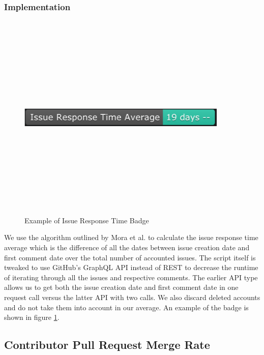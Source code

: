 \documentclass[12pt, letterpaper]{article}
\begin{document}
\subsubsection{Implementation}

\begin{figure}[!htb]
    \centerline{
        \includegraphics[width=10cm,height=10cm,keepaspectratio=true]{issueresponsebadge}
    }
    \caption{
        Example of Issue Response Time Badge
    }
    \label{issueresponse}
\end{figure}

We use the algorithm outlined by Mora et al. \cite{metrics} to calculate the issue response time average which
is the difference of all the dates between issue creation date and first comment date over the total number of 
accounted issues. 
The script itself is tweaked to use GitHub's \cite{github} GraphQL API instead of REST to decrease the runtime of iterating through
all the issues and respective comments. The earlier API type allows us to get both the issue creation date and first
comment date in one request call versus the latter API with two calls.
We also discard deleted accounts and do not take them into account in our average.
An example of the badge is shown in figure \ref{issueresponse}.


\subsection{Contributor Pull Request Merge Rate}
\end{document}
